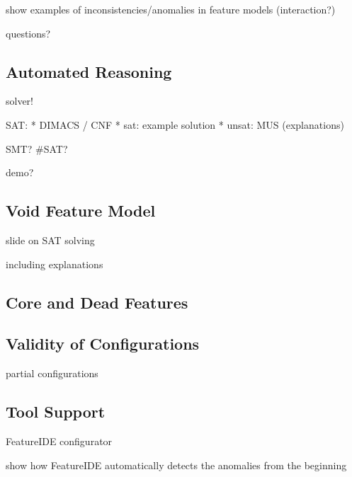 show examples of inconsistencies/anomalies in feature models (interaction?)

questions?

\subsection{Automated Reasoning}

solver!

SAT:
* DIMACS / CNF
* sat: example solution
* unsat: MUS (explanations)

SMT? \#SAT?

demo?

\subsection{Void Feature Model}

slide on SAT solving

including explanations

\subsection{Core and Dead Features}

\subsection{Validity of Configurations}

partial configurations

%
%

\subsection{Tool Support}

FeatureIDE configurator

show how FeatureIDE automatically detects the anomalies from the beginning



